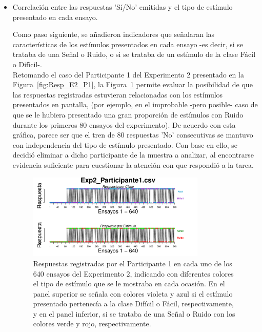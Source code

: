 \begin{itemize}
	\item Correlación entre las respuestas 'Sí/No' emitidas y el tipo de estímulo presentado en cada ensayo.

Como paso siguiente, se añadieron indicadores que señalaran las características de los estímulos presentados en cada ensayo -es decir, si se trataba de una Señal o Ruido, o si se trataba de un estímulo de la clase Fácil o Difícil-.\\ 

Retomando el caso del Participante 1 del Experimento 2 presentado en la Figura~\ref{fig:Resp_E2_P1}, la Figura~\ref{fig:BiasResp_E1_P1} permite evaluar la posibilidad de que las respuestas registradas estuvieran relacionadas con los estímulos presentados en pantalla, (por ejemplo, en el improbable -pero posible- caso de que se le hubiera presentado una gran proporción de estímulos con Ruido durante los primeros 80 ensayos del experimento). De acuerdo con esta gráfica, parece ser que el tren de 80 respuestas 'No' consecutivas se mantuvo con independencia del tipo de estímulo presentado. Con base en ello, se decidió eliminar a dicho participante de la muestra a analizar, al encontrarse evidencia suficiente para cuestionar la atención con que respondió a la tarea.\\

\begin{figure}[th]
\centering
\includegraphics[width=0.80\textwidth]{Figures/BiasResp_Exp2_P1} 
\caption[Respuesta por Tipo de Estímulo; ejemplo de participante sesgado]{Respuestas registradas por el Participante 1 en cada uno de los 640 ensayos del Experimento 2, indicando con diferentes colores el tipo de estímulo que se le mostraba en cada ocasión. En el panel superior se señala con colores violeta y azul si el estímulo presentado pertenecía a la clase Difícil o Fácil, respectivamente, y en el panel inferior, si se trataba de una Señal o Ruido con los colores verde y rojo, respectivamente.}
\label{fig:BiasResp_E1_P1}
\end{figure}


\end{itemize}
